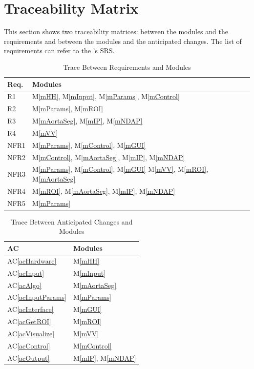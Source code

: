 \documentclass[12pt, titlepage]{article}
\newcommand{\acref}[1]{AC\ref{#1}}
\newcommand{\mref}[1]{M\ref{#1}}
\begin{document}
\newpage

\section{Traceability Matrix} \label{SecTM}

This section shows two traceability matrices: between the modules and the
requirements and between the modules and the anticipated changes. The list of requirements can refer to the \progname{}'s SRS. \cite{SRS}

\begin{table}[H]
\centering
\begin{tabular}{p{} p{}}
\toprule
\textbf{Req.} & \textbf{Modules}\\
\midrule
R1 & \mref{mHH}, \mref{mInput}, \mref{mParams}, \mref{mControl}\\
R2 & \mref{mParams}, \mref{mROI}\\
R3 &  \mref{mAortaSeg}, \mref{mIP}, \mref{mNDAP}\\
R4 & \mref{mVV}\\
NFR1 & \mref{mParams}, \mref{mControl}, \mref{mGUI}\\
NFR2 & \mref{mControl}, \mref{mAortaSeg}, \mref{mIP}, \mref{mNDAP}\\
NFR3 & \mref{mParams}, \mref{mControl}, \mref{mGUI} \mref{mVV}, \mref{mROI},  \mref{mAortaSeg}\\
NFR4 & \mref{mROI},  \mref{mAortaSeg}, \mref{mIP}, \mref{mNDAP}\\
NFR5 & \mref{mParams}\\
\bottomrule
\end{tabular}
\caption{Trace Between Requirements and Modules}
\label{TblRT}
\end{table}

\begin{table}[H]
\centering
\begin{tabular}{p{} p{}}
\toprule
\textbf{AC} & \textbf{Modules}\\
\midrule
\acref{acHardware} & \mref{mHH}\\
\acref{acInput} & \mref{mInput}\\
\acref{acAlgo} & \mref{mAortaSeg}\\
\acref{acInputParams} & \mref{mParams}\\
\acref{acInterface} & \mref{mGUI}\\
\acref{acGetROI} & \mref{mROI} \\
\acref{acVisualize} & \mref{mVV}\\
\acref{acControl} & \mref{mControl}\\
\acref{acOutput} & \mref{mIP}, \mref{mNDAP} \\
\bottomrule
\end{tabular}
\caption{Trace Between Anticipated Changes and Modules}
\label{TblACT}
\end{table}
\end{document}
